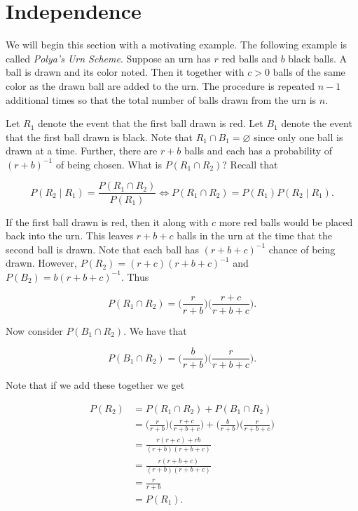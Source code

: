 \documentclass{article}
\theoremstyle{definition}
\theoremstyle{remark}
\theoremstyle{definition}
\begin{document}
\section{Independence}

    We will begin this section with a motivating example. The following example is called \textit{Polya's Urn Scheme}. Suppose an urn has $r$ red balls and $b$ black balls. A ball is drawn and its color noted. Then it together with $c>0$ balls of the same color as the drawn ball are added to the urn. The procedure is repeated $n-1$ additional times so that the total number of balls drawn from the urn is $n$.\par Let $R_1$ denote the event that the first ball drawn is red. Let $B_1$ denote the event that the first ball drawn is black. Note that $R_1\cap B_1=\varnothing$ since only one ball is drawn at a time. Further, there are $r+b$ balls and each has a probability of $(r+b)^{-1}$ of being chosen. What is $P(R_1\cap R_2)$? Recall that 
    
    \begin{equation*}
        P(R_2\mid R_1)=\frac{P(R_1\cap R_2)}{P(R_1)}\Leftrightarrow P(R_1\cap R_2)=P(R_1)P(R_2\mid R_1).  
    \end{equation*}
    
    If the first ball drawn is red, then it along with $c$ more red balls would be placed back into the urn. This leaves $r+b+c$ balls in the urn at the time that the second ball is drawn. Note that each ball has $(r+b+c)^{-1}$ chance of being drawn. However, $P(R_2)=(r+c)(r+b+c)^{-1}$ and $P(B_2)=b(r+b+c)^{-1}$. Thus 
    
    \begin{equation*}
        P(R_1\cap R_2)=\bigg(\frac{r}{r+b}\bigg)\bigg(\frac{r+c}{r+b+c}\bigg).
    \end{equation*}
    
    Now consider $P(B_1\cap R_2)$. We have that 
    
    \begin{equation*}
        P(B_1\cap R_2)=\bigg(\frac{b}{r+b}\bigg)\bigg(\frac{r}{r+b+c}\bigg).
    \end{equation*}
    
    Note that if we add these together we get
    
    \begin{equation*}
        \begin{split}
            P(R_2)&=P(R_1\cap R_2)+P(B_1\cap R_2) \\
            &=\bigg(\frac{r}{r+b}\bigg)\bigg(\frac{r+c}{r+b+c}\bigg)+\bigg(\frac{b}{r+b}\bigg)\bigg(\frac{r}{r+b+c}\bigg) \\
            &=\frac{r(r+c)+rb}{(r+b)(r+b+c)}\\
            &= \frac{r(r+b+c)}{(r+b)(r+b+c)} \\
            &= \frac{r}{r+b} \\
            &= P(R_1).
        \end{split}
    \end{equation*}
    
\end{document}
